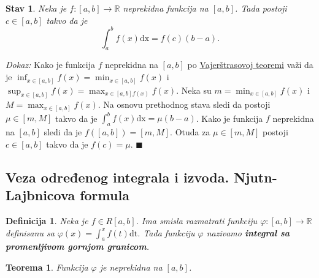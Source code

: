 \documentclass{article}
\newtheorem{definicija}{Definicija}[section]
\newtheorem{teorema}{Teorema}[section]
\newtheorem{stav}{Stav}[section]
\begin{document}
\begin{stavbox}
    \label{stav_2.12}
    \begin{stav}
        Neka je $f: \left[a, b\right] \longrightarrow \mathbb{R}$ neprekidna funkcija na $\left[a, b\right]$. Tada postoji $c\in \left[a,b\right]$ takvo da je
        $$ \int^b_a f\left(x\right)\text{dx} = f\left(c\right)\left(b-a\right).$$
    \end{stav}
\end{stavbox}

\textit{Dokaz:} Kako je funkcija $f$ neprekidna na $\left[a, b\right]$ po \hyperref[podsetnik_teoreme_3]{Vajerštrasovoj teoremi} važi da je $\displaystyle \inf_{x\in\left[a,b\right]} f\left(x\right) = \min_{x \in \left[a, b\right]} f\left(x\right)$ i
$\displaystyle \sup_{x\in\left[a,b\right]} f\left(x\right) = \max_{x \in \left[a, b\right] f\left(x\right)}f\left(x\right)$. Neka su $\displaystyle m = \min_{x\in\left[a,b\right]} f\left(x\right)$ i  $\displaystyle M = \max_{x\in\left[a,b\right]} f\left(x\right)$.
Na osnovu prethodnog stava sledi da postoji $\mu \in \left[m, M\right]$ takvo da je $\displaystyle \int^b_a f\left(x\right) \text{dx} = \mu \left(b-a\right)$. Kako je funkcija $f$ neprekidna
na $\left[a, b\right]$ sledi da je $f\left(\left[a,b\right]\right) = \left[m, M\right]$. Otuda za $\mu \in \left[m, M\right]$ postoji $c \in \left[a, b\right]$ takvo da je $f\left(c\right) = \mu$.
\null\hfill $\blacksquare$\par

\subsection{Veza određenog integrala i izvoda. Njutn-Lajbnicova formula}

\begin{defbox}
    \label{definicija_2.13}
    \begin{definicija}
        Neka je $f \in R\left[a, b\right]$. Ima smisla razmatrati funkciju $\varphi:\left[a, b\right] \longrightarrow \mathbb{R}$ definisanu sa $\varphi \left(x\right) = \displaystyle \int^x_a f\left(t\right)\text{dt}$. Tada funkciju
        $\varphi$ nazivamo \textbf{integral sa promenljivom gornjom granicom}.
    \end{definicija}
\end{defbox}

\begin{teoremabox}
    \label{teorema_2.7}
    \begin{teorema}
        Funkcija $\varphi$ je neprekidna na $\left[a, b\right]$.
    \end{teorema}
\end{teoremabox}
\end{document}
